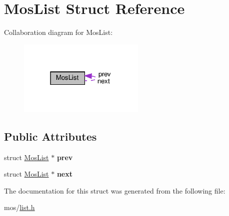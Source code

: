 \hypertarget{structMosList}{}\section{Mos\+List Struct Reference}
\label{structMosList}


Collaboration diagram for Mos\+List\+:\nopagebreak
\begin{figure}[H]
\begin{center}
\leavevmode
\includegraphics[width=171pt]{structMosList__coll__graph}
\end{center}
\end{figure}
\subsection*{Public Attributes}
\begin{DoxyCompactItemize}
\item 
\mbox{\label{structMosList_acd83f0bcc6dcde24468183cf47b69f37}} 
struct \hyperlink{structMosList}{Mos\+List} $\ast$ {\bfseries prev}
\item 
\mbox{\label{structMosList_ab119e85d9884731d627fb11b1c1366bb}} 
struct \hyperlink{structMosList}{Mos\+List} $\ast$ {\bfseries next}
\end{DoxyCompactItemize}


The documentation for this struct was generated from the following file\+:\begin{DoxyCompactItemize}
\item 
mos/\hyperlink{list_8h}{list.\+h}\end{DoxyCompactItemize}
